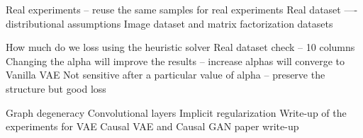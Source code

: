 Real experiments -- reuse the same samples for real experiments
Real dataset —- distributional assumptions
Image dataset and matrix factorization datasets

How much do we loss using the heuristic solver
Real dataset check -- 10 columns
Changing the alpha will improve the results -- increase alphas will converge to Vanilla VAE
Not sensitive after a particular value of alpha -- preserve the structure but good loss

Graph degeneracy
Convolutional layers
Implicit regularization
Write-up of the experiments for VAE
Causal VAE and Causal GAN paper write-up

